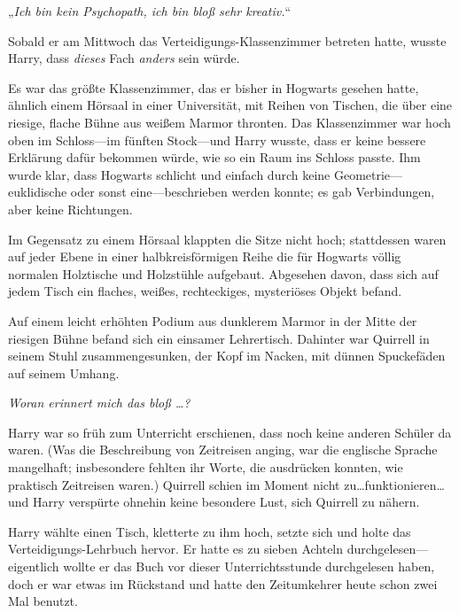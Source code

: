 

\hypertarget{laterales-denken}{%

\later

„\emph{Ich bin kein Psychopath, ich bin bloß sehr kreativ.}“

\later

Sobald er am Mittwoch das Verteidigungs-Klassenzimmer betreten hatte, wusste Harry, dass \emph{dieses} Fach \emph{anders} sein würde.

Es war das größte Klassenzimmer, das er bisher in Hogwarts gesehen hatte, ähnlich einem Hörsaal in einer Universität, mit Reihen von Tischen, die über eine riesige, flache Bühne aus weißem Marmor thronten. Das Klassenzimmer war hoch oben im Schloss—im fünften Stock—und Harry wusste, dass er keine bessere Erklärung dafür bekommen würde, wie so ein Raum ins Schloss passte. Ihm wurde klar, dass Hogwarts schlicht und einfach durch keine Geometrie—euklidische oder sonst eine—beschrieben werden konnte; es gab Verbindungen, aber keine Richtungen.

Im Gegensatz zu einem Hörsaal klappten die Sitze nicht hoch; stattdessen waren auf jeder Ebene in einer halbkreisförmigen Reihe die für Hogwarts völlig normalen Holztische und Holzstühle aufgebaut. Abgesehen davon, dass sich auf jedem Tisch ein flaches, weißes, rechteckiges, mysteriöses Objekt befand.

Auf einem leicht erhöhten Podium aus dunklerem Marmor in der Mitte der riesigen Bühne befand sich ein einsamer Lehrertisch. Dahinter war Quirrell in seinem Stuhl zusammengesunken, der Kopf im Nacken, mit dünnen Spuckefäden auf seinem Umhang.

\emph{Woran erinnert mich das bloß …?}

Harry war so früh zum Unterricht erschienen, dass noch keine anderen Schüler da waren. (Was die Beschreibung von Zeitreisen anging, war die englische Sprache mangelhaft; insbesondere fehlten ihr Worte, die ausdrücken konnten, wie praktisch Zeitreisen waren.) Quirrell schien im Moment nicht zu…funktionieren…und Harry verspürte ohnehin keine besondere Lust, sich Quirrell zu nähern.

Harry wählte einen Tisch, kletterte zu ihm hoch, setzte sich und holte das Verteidigungs-Lehrbuch hervor. Er hatte es zu sieben Achteln durchgelesen—eigentlich wollte er das Buch vor dieser Unterrichtsstunde durchgelesen haben, doch er war etwas im Rückstand und hatte den Zeitumkehrer heute schon zwei Mal benutzt.

}
